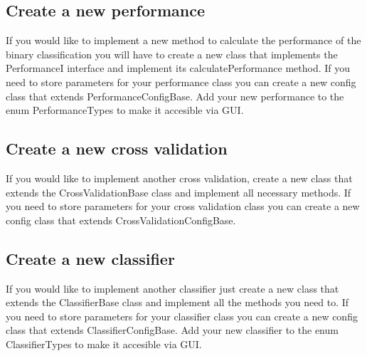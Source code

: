 \documentclass[headsepline,12pt,a4paper]{scrartcl}
\begin{document}
\subsection{Create a new performance}

If you would like to implement a new method to calculate the performance of
the binary classification you will have to create a new class that
implements the PerformanceI interface and implement its
calculatePerformance method. If you need to store parameters for your
performance class you can create a new config class that extends
PerformanceConfigBase. Add your new performance to the enum
PerformanceTypes to make it accesible via GUI.
 
\subsection{Create a new cross validation}

If you would like to implement another cross validation, 
create a new class that extends the CrossValidationBase class and 
implement all necessary methods. If you need to store parameters for your
cross validation class you can create a new config class that extends
CrossValidationConfigBase. 

\subsection{Create a new classifier}

If you would like to implement another classifier just create a new class
that extends the ClassifierBase class and implement all the methods
you need to.  If you need to store parameters for your classifier
class you can create a new config class that extends ClassifierConfigBase. Add your new classifier to the enum
ClassifierTypes to make it accesible via GUI.
\end{document}
